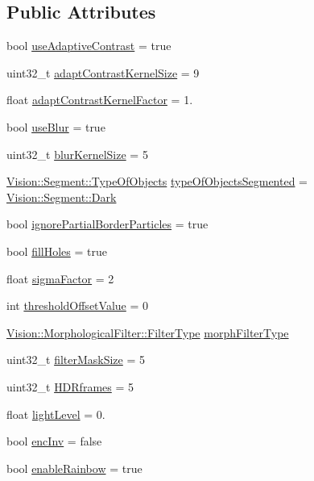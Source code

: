 \subsection*{Public Attributes}
\begin{DoxyCompactItemize}
\item 
bool \hyperlink{class_soil_analyzer_1_1_soil_settings_a0e27335d05aed8f3f084744062368578}{use\+Adaptive\+Contrast} = true
\item 
uint32\+\_\+t \hyperlink{class_soil_analyzer_1_1_soil_settings_a73f627b092dbdbda37b66ef6c2eef95c}{adapt\+Contrast\+Kernel\+Size} = 9
\item 
float \hyperlink{class_soil_analyzer_1_1_soil_settings_ace12c0f4bc35d420ef528cc390fc2cdb}{adapt\+Contrast\+Kernel\+Factor} = 1.
\item 
bool \hyperlink{class_soil_analyzer_1_1_soil_settings_a21bd246a48a712734af86f592030e18b}{use\+Blur} = true
\item 
uint32\+\_\+t \hyperlink{class_soil_analyzer_1_1_soil_settings_afa46542d30045e00fadbdd5a6ab9a1e1}{blur\+Kernel\+Size} = 5
\item 
\hyperlink{class_vision_1_1_segment_ac3ddf2c72ee6333007510b680db1e7dd}{Vision\+::\+Segment\+::\+Type\+Of\+Objects} \hyperlink{class_soil_analyzer_1_1_soil_settings_a21ae88dba6b9b0b07d9c26812bc739fb}{type\+Of\+Objects\+Segmented} = \hyperlink{class_vision_1_1_segment_ac3ddf2c72ee6333007510b680db1e7dda962a0c0955809f63df036dbd41824c54}{Vision\+::\+Segment\+::\+Dark}
\item 
bool \hyperlink{class_soil_analyzer_1_1_soil_settings_a24fb1d7da2247da77a17d853ea1494d7}{ignore\+Partial\+Border\+Particles} = true
\item 
bool \hyperlink{class_soil_analyzer_1_1_soil_settings_a2c9dbe9429742aed1da9d9683da5cc1e}{fill\+Holes} = true
\item 
float \hyperlink{class_soil_analyzer_1_1_soil_settings_a97e62512e12a2ba9210fd93950b6e717}{sigma\+Factor} = 2
\item 
int \hyperlink{class_soil_analyzer_1_1_soil_settings_a48330eb812672b50a94483f264614e8f}{threshold\+Offset\+Value} = 0
\item 
\hyperlink{class_vision_1_1_morphological_filter_a1f19c9cb13f0d68778c77d6fd0370868}{Vision\+::\+Morphological\+Filter\+::\+Filter\+Type} \hyperlink{class_soil_analyzer_1_1_soil_settings_ad1420c4800badb3eb07eba4767e3df81}{morph\+Filter\+Type}
\item 
uint32\+\_\+t \hyperlink{class_soil_analyzer_1_1_soil_settings_ad9d5071bbf6d10638df024e883c6199f}{filter\+Mask\+Size} = 5
\item 
uint32\+\_\+t \hyperlink{class_soil_analyzer_1_1_soil_settings_a77e631ff44efe74762b5adaa2eb2cd11}{H\+D\+Rframes} = 5
\item 
float \hyperlink{class_soil_analyzer_1_1_soil_settings_aa4d3ed8c1ab6551bfa4763e8a1ffc148}{light\+Level} = 0.
\item 
bool \hyperlink{class_soil_analyzer_1_1_soil_settings_ad831e13b61fc2097219bbf7252f045d5}{enc\+Inv} = false
\item 
bool \hyperlink{class_soil_analyzer_1_1_soil_settings_a9ece0b96eb8614a497fba3a19d8b4da1}{enable\+Rainbow} = true
\end{DoxyCompactItemize}
